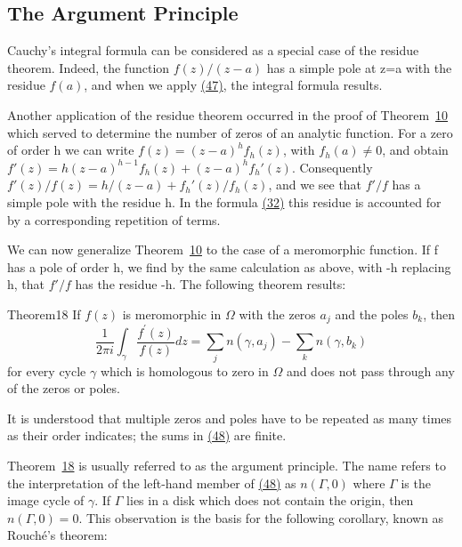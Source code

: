 \setcounter{section}{5}\setcounter{subsection}{1}\subsection{The Argument Principle}\label{sec:4.5.2}
Cauchy's integral formula can be considered as a special case of the residue theorem. Indeed, the function $f(z)/(z-a)$ has a simple pole at z=a with the residue $f(a)$, and when we apply \hyperref[eq:4.47]{(47)}, the integral formula results.

Another application of the residue theorem occurred in the proof of Theorem~\hyperref[thm:4.10]{10} which served to determine the number of zeros of an analytic function. For a zero of order h we can write $f(z) = (z - a)^{h}f_{h}(z)$, with $f_{h}(a) \neq 0$, and obtain $f'(z) = h(z - a)^{h-1}f_{h}(z) + (z - a)^{h}f_{h}'(z)$. Consequently $f'(z)/f(z) = h/(z - a) + f_{h}'(z)/f_{h}(z)$, and we see that $f'/f$ has a simple pole with the residue h. In the formula \hyperref[eq:4.32]{(32)} this residue is accounted for by a corresponding repetition of terms.

We can now generalize Theorem~\hyperref[thm:4.10]{10} to the case of a meromorphic function. If f has a pole of order h, we find by the same calculation as above, with -h replacing h, that $f'/f$ has the residue -h. The following theorem results:

\begin{originalstatement}{Theorem}{18}\label{thm:4.18}
If $f(z)$ is meromorphic in $\Omega$ with the zeros $a_{j}$ and the poles $b_{k}$, then
\begin{equation*}
\frac {1}{2 \pi i} \int_ {\gamma} \frac {f ^ {\prime} (z)}{f (z)} d z = \sum_ {j} n (\gamma , a _ {j}) - \sum_ {k} n (\gamma , b _ {k})\tag{48}\label{eq:4.48}
\end{equation*}
for every cycle $\gamma$ which is homologous to zero in $\Omega$ and does not pass through any of the zeros or poles.

\end{originalstatement}

It is understood that multiple zeros and poles have to be repeated as many times as their order indicates; the sums in \hyperref[eq:4.48]{(48)} are finite.

Theorem~\hyperref[thm:4.18]{18} is usually referred to as the argument principle. The name refers to the interpretation of the left-hand member of \hyperref[eq:4.48]{(48)} as $n(\Gamma,0)$ where $\Gamma$ is the image cycle of $\gamma$. If $\Gamma$ lies in a disk which does not contain the origin, then $n(\Gamma,0) = 0$. This observation is the basis for the following corollary, known as Rouché's theorem:

